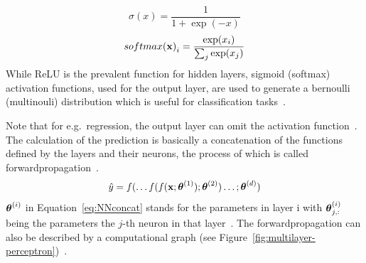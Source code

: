 \begin{equation}\label{eq:sigmoid}
    \sigma(x)=\frac{1}{1+\exp(-x)}
\end{equation}
\begin{equation}\label{eq:softmax}
    {softmax(\textbf{x})}_i = \frac{\exp(x_i)}{\sum_j \exp(x_j)}
\end{equation}
While ReLU is the prevalent function for hidden layers, sigmoid (softmax) activation functions,
used for the output layer, are used to generate a bernoulli (multinouli) distribution which is
useful for classification tasks~\citep{goodfellow_deep_2016}.

Note that for e.g.\ regression, the output layer can omit the activation
function~\citep{goodfellow_deep_2016}.
The calculation of the prediction is basically a concatenation of the functions defined by the
layers and their neurons, the process of which is called
forwardpropagation~\citep{ponti_everything_2017,goodfellow_deep_2016}.
\begin{equation}\label{eq:NNconcat}
    \hat{y}=f(\ldots f(f(\textbf{x};\boldsymbol{\theta}^{(1)});\boldsymbol{\theta}^{(2)})\ldots;\boldsymbol{\theta}^{(d)})
\end{equation}
$\boldsymbol{\theta}^{(i)}$ in Equation~\ref{eq:NNconcat} stands for the parameters in layer i with $\boldsymbol{\theta}^{(i)}_{j,:}$
being the parameters the $j$-th neuron in that layer~\citep{goodfellow_deep_2016}.
The forwardpropagation can also be described by a computational graph (see
Figure~\ref{fig:multilayer-perceptron})~\citep{goodfellow_deep_2016}.

